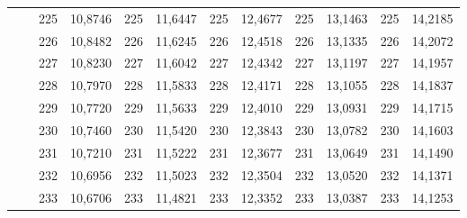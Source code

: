 \documentclass[a4paper,12pt]{article} %
\begin{document}
\begin{longtable}[c]{cccccccccc|c|c|}
	& \multicolumn{1}{c|}{} & \multicolumn{1}{c|}{225} & \multicolumn{1}{c|}{10,8746} & \multicolumn{1}{c|}{225} & \multicolumn{1}{c|}{11,6447} & \multicolumn{1}{c|}{225} & \multicolumn{1}{c|}{12,4677} & \multicolumn{1}{c|}{225} & 13,1463 & 225 & 14,2185 \\ \cline{3-12} 
	& \multicolumn{1}{c|}{} & \multicolumn{1}{c|}{226} & \multicolumn{1}{c|}{10,8482} & \multicolumn{1}{c|}{226} & \multicolumn{1}{c|}{11,6245} & \multicolumn{1}{c|}{226} & \multicolumn{1}{c|}{12,4518} & \multicolumn{1}{c|}{226} & 13,1335 & 226 & 14,2072 \\ \cline{3-12} 
	& \multicolumn{1}{c|}{} & \multicolumn{1}{c|}{227} & \multicolumn{1}{c|}{10,8230} & \multicolumn{1}{c|}{227} & \multicolumn{1}{c|}{11,6042} & \multicolumn{1}{c|}{227} & \multicolumn{1}{c|}{12,4342} & \multicolumn{1}{c|}{227} & 13,1197 & 227 & 14,1957 \\ \cline{3-12} 
	& \multicolumn{1}{c|}{} & \multicolumn{1}{c|}{228} & \multicolumn{1}{c|}{10,7970} & \multicolumn{1}{c|}{228} & \multicolumn{1}{c|}{11,5833} & \multicolumn{1}{c|}{228} & \multicolumn{1}{c|}{12,4171} & \multicolumn{1}{c|}{228} & 13,1055 & 228 & 14,1837 \\ \cline{3-12} 
	& \multicolumn{1}{c|}{} & \multicolumn{1}{c|}{229} & \multicolumn{1}{c|}{10,7720} & \multicolumn{1}{c|}{229} & \multicolumn{1}{c|}{11,5633} & \multicolumn{1}{c|}{229} & \multicolumn{1}{c|}{12,4010} & \multicolumn{1}{c|}{229} & 13,0931 & 229 & 14,1715 \\ \cline{3-12} 
	& \multicolumn{1}{c|}{} & \multicolumn{1}{c|}{230} & \multicolumn{1}{c|}{10,7460} & \multicolumn{1}{c|}{230} & \multicolumn{1}{c|}{11,5420} & \multicolumn{1}{c|}{230} & \multicolumn{1}{c|}{12,3843} & \multicolumn{1}{c|}{230} & 13,0782 & 230 & 14,1603 \\ \cline{3-12} 
	& \multicolumn{1}{c|}{} & \multicolumn{1}{c|}{231} & \multicolumn{1}{c|}{10,7210} & \multicolumn{1}{c|}{231} & \multicolumn{1}{c|}{11,5222} & \multicolumn{1}{c|}{231} & \multicolumn{1}{c|}{12,3677} & \multicolumn{1}{c|}{231} & 13,0649 & 231 & 14,1490 \\ \cline{3-12} 
	& \multicolumn{1}{c|}{} & \multicolumn{1}{c|}{232} & \multicolumn{1}{c|}{10,6956} & \multicolumn{1}{c|}{232} & \multicolumn{1}{c|}{11,5023} & \multicolumn{1}{c|}{232} & \multicolumn{1}{c|}{12,3504} & \multicolumn{1}{c|}{232} & 13,0520 & 232 & 14,1371 \\ \cline{3-12} 
	& \multicolumn{1}{c|}{} & \multicolumn{1}{c|}{233} & \multicolumn{1}{c|}{10,6706} & \multicolumn{1}{c|}{233} & \multicolumn{1}{c|}{11,4821} & \multicolumn{1}{c|}{233} & \multicolumn{1}{c|}{12,3352} & \multicolumn{1}{c|}{233} & 13,0387 & 233 & 14,1253 \\ \cline{3-12} 

\end{longtable}
\end{document}
